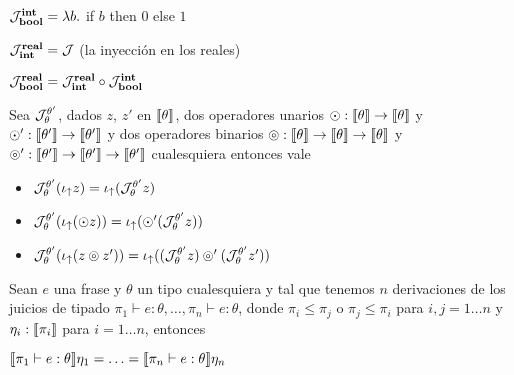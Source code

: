 $\mathcal{J}_{\textbf{bool}}^{\textbf{int}} = \lambda b .$ if $b$ then $0$ else $1$\\
\indent

$\mathcal{J}_{\textbf{int}}^{\textbf{real}} = \mathcal{J}$ (la inyecci\'on en los reales)\\
\indent

$\mathcal{J}_{\textbf{bool}}^{\textbf{real}} = \mathcal{J}_{\textbf{int}}^{\textbf{real}} \circ \mathcal{J}_{\textbf{bool}}^{\textbf{int}}$\\

\begin{proposition}
Sea $\mathcal{J}_{\theta}^{\theta'}$, dados $z$, $z'$ en $\llbracket \theta \rrbracket$, dos operadores
unarios $\odot : \llbracket \theta \rrbracket \rightarrow \llbracket \theta \rrbracket$ y 
$\odot' : \llbracket \theta' \rrbracket \rightarrow \llbracket \theta' \rrbracket$ y dos operadores
binarios $\circledcirc : \llbracket \theta \rrbracket \rightarrow 
		\llbracket \theta \rrbracket \rightarrow \llbracket \theta \rrbracket$ y
$\circledcirc' : \llbracket \theta' \rrbracket \rightarrow 
		\llbracket \theta' \rrbracket \rightarrow \llbracket \theta' \rrbracket$
cualesquiera entonces vale

\begin{itemize}
\item $\mathcal{J}_{\theta}^{\theta'} (\iota_{\uparrow} z) = \iota_{\uparrow} (\mathcal{J}_{\theta}^{\theta'} z)$
\item $\mathcal{J}_{\theta}^{\theta'} (\iota_{\uparrow} (\odot z)) = \iota_{\uparrow} (\odot' (\mathcal{J}_{\theta}^{\theta'} z))$
\item $\mathcal{J}_{\theta}^{\theta'} (\iota_{\uparrow} (z \circledcirc z')) = 
	   \iota_{\uparrow} ((\mathcal{J}_{\theta}^{\theta'} z) \circledcirc' (\mathcal{J}_{\theta}^{\theta'} z'))$

\end{itemize}

\end{proposition}

\begin{theorem}[De PreCoherencia]
Sean $e$ una frase y $\theta$ un tipo cualesquiera y tal que tenemos 
$n$ derivaciones de los juicios de tipado
$\pi_1 \vdash e : \theta, \ldots, \pi_n \vdash e : \theta$, donde
$\pi_i \leq \pi_j$ o $\pi_j \leq \pi_i$ para $i,j = 1 \ldots n$ y
$\eta_i : \llbracket \pi_i \rrbracket$ para $i = 1 \ldots n$, entonces

\begin{center}
$\llbracket \pi_1 \vdash e : \theta \rrbracket\eta_1 = \ldots = \llbracket \pi_n \vdash e : \theta \rrbracket\eta_n$
\end{center}

\end{theorem}

